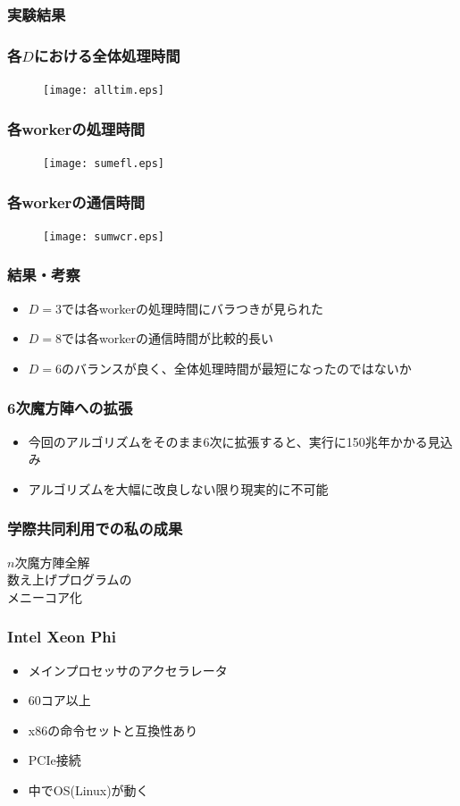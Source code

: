 \documentclass[dvipdfmx,20pt,notheorems,t]{beamer}
\begin{document}
\begin{frame}\frametitle{実験結果}
\end{frame}

\begin{frame}\frametitle{各$D$における全体処理時間}
\begin{figure}[htb]
\centering
\texttt{[image: alltim.eps]}
\end{figure}
\end{frame}

\begin{frame}\frametitle{各workerの処理時間}
\begin{figure}[htb]
\centering
\texttt{[image: sumefl.eps]}
\end{figure}
\end{frame}

\begin{frame}\frametitle{各workerの通信時間}
\begin{figure}[htb]
\centering
\texttt{[image: sumwcr.eps]}
\end{figure}
\end{frame}

\begin{frame}\frametitle{結果・考察}
\begin{itemize}
\item $D=3$では各workerの処理時間にバラつきが見られた
\item $D=8$では各workerの通信時間が比較的長い
\item $D=6$のバランスが良く、全体処理時間が最短になったのではないか
\end{itemize}
\end{frame}

\begin{frame}\frametitle{6次魔方陣への拡張}
\begin{itemize}
\item 今回のアルゴリズムをそのまま6次に拡張すると、実行に150兆年かかる見込み
\item アルゴリズムを大幅に改良しない限り現実的に不可能
\end{itemize}
\end{frame}

\begin{frame}\frametitle{学際共同利用での私の成果}
\centering
\large
$n$次魔方陣全解 \\
数え上げプログラムの \\
メニーコア化
\end{frame}

\begin{frame}\frametitle{Intel Xeon Phi}
\begin{itemize}
\item メインプロセッサのアクセラレータ
\item 60コア以上
\item x86の命令セットと互換性あり
\item PCIe接続
\item 中でOS(Linux)が動く
\end{itemize}
\end{frame}
\end{document}
